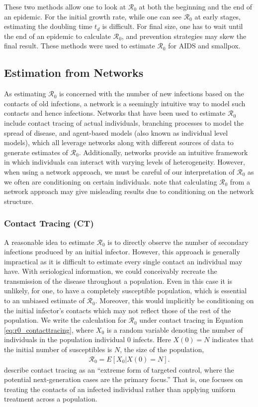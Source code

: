 \documentclass[12pt]{article}
\newcommand{\rr}{\ensuremath{\mathcal{R}_0}}
\begin{document}
  These two methods allow one to look at $\rr$ at both the beginning and the end of an epidemic.   For the initial growth rate, while one can see $\rr$ at early stages, estimating the doubling time $t_d$ is difficult.  For final size, one has to wait until the end of an epidemic to calculate $\rr$, and prevention strategies may skew the final result.  These methods were used to estimate $\rr$ for AIDS and smallpox.

  \subsection{Estimation from Networks}
As estimating $\rr$ is concerned with the number of new infections based on the contacts of old infections, a network is a seemingly intuitive way to model such contacts and hence infections.  Networks that have been used to estimate $\rr$ include contact tracing of actual individuals, branching processes to model the spread of disease, and agent-based models (also known as individual level models), which all leverage networks along with different sources of data to generate estimates of $\rr$.  Additionally, networks provide an intuitive framework in which individuals can interact with varying levels of heterogeneity.  However, when using a network approach, we must be careful of our interpretation of $\rr$ as we often are conditioning on certain individuals.    \cite{breban2007} note that calculating $\rr$ from a network approach may give misleading results due to conditioning on the network structure.
  
\label{sec:network}

\subsubsection{Contact Tracing (CT)}
\label{sec:contact_tracing}
A reasonable idea to estimate $\rr$ is to directly observe the number of secondary infections produced by an initial infector.  However, this approach is generally impractical as it is difficult to estimate every single contact an individual may have.   With seriological information, we could conceivably recreate the transmission of the disease throughout a population.  Even in this case it is unlikely, for one, to have a completely susceptible population, which is essential to an unbiased estimate of $\rr$.  Moreover, this would implicitly be conditioning on the initial infector's contacts which may not reflect those of the rest of the population.  We write the calculation for $\rr$ under contact tracing in Equation \ref{eq:r0_contacttracing}, where $X_0$ is a random variable denoting the number of individuals in the population individual 0 infects.  Here $X(0)=N$ indicates that the initial number of susceptibles is $N$, the size of the population,
\begin{align}\label{eq:r0_contacttracing}
\rr = E[ X_0 | X(0) = N].
\end{align}
\cite{eames2003} describe contact tracing as an ``extreme form of targeted control, where the potential next-generation cases are the primary focus.'' That is, one focuses on treating the contacts of an infected individual rather than applying uniform treatment across a population.
\end{document}

